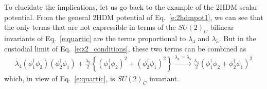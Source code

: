\documentclass[11pt]{article}
\begin{document}
%
To elucidate the implications, let us go back to the example of the 2HDM scalar potential.  
From the general 2HDM potential of Eq.~\eqref{e:2hdmpot1}, we can see that the only terms that are not expressible in terms of the $SU(2)_C$ bilinear invariants of Eq.~\eqref{e:quartic} are the terms proportional to $\lambda_4$ and $\lambda_5$.  
But in the custodial limit of Eq.~\eqref{e:z2_conditions}, these two terms can be combined as 
\begin{eqnarray}
\label{e:gentocs2hdm}
\lambda_4(\phi_1^\dagger \phi_2)(\phi_2^\dagger \phi_1) + \frac{\lambda_5}{2} \left\{(\phi_1^\dagger \phi_2)^2+(\phi_2^\dagger\phi_1)^2\right\}\xrightarrow{\lambda_4=\lambda_5}\frac{\lambda_4}{2}(\phi_1^\dagger \phi_2+\phi_2^\dagger \phi_1)^2
\end{eqnarray}
which, in view of Eq.~\eqref{e:quartic}, is $SU(2)_C$ invariant.
  
\end{document}
